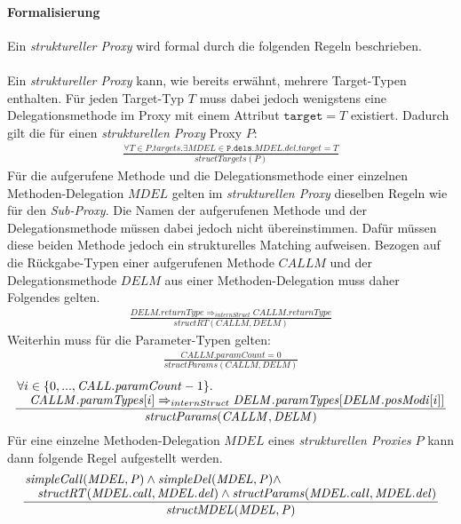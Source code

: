 \documentclass[a4paper,12pt]{article}
\begin{document}
\paragraph{Formalisierung}
Ein \emph{struktureller Proxy} wird formal durch die folgenden Regeln beschrieben.\\\\
Ein \emph{struktureller Proxy} kann, wie bereits erwähnt, mehrere Target-Typen enthalten.
Für jeden Target-Typ $T$ muss dabei jedoch wenigstens eine Delegationsmethode im Proxy mit einem Attribut $\texttt{target} = T$ existiert. Dadurch gilt die für einen \emph{strukturellen Proxy} Proxy $P$:
\begin{gather*}
\frac{\forall T \in \mathit{P.targets}.\exists \mathit{MDEL} \in \mathtt{P.dels}.\mathit{MDEL.del.target} = T}{\mathit{structTargets(P)}}
\end{gather*}
Für die aufgerufene Methode und die Delegationsmethode einer einzelnen Methoden-Delegation $\mathit{MDEL}$ gelten im \emph{strukturellen Proxy} dieselben Regeln wie für den \emph{Sub-Proxy}. Die Namen der aufgerufenen Methode und der Delegationsmethode müssen dabei jedoch nicht übereinstimmen. Dafür müssen diese beiden Methode jedoch ein strukturelles Matching aufweisen. Bezogen auf die Rückgabe-Typen einer aufgerufenen Methode $\mathit{CALLM}$ und der Delegationsmethode $\mathit{DELM}$ aus einer Methoden-Delegation muss daher Folgendes gelten.
\begin{gather*}
\frac{\mathit{DELM.returnType} \Rightarrow_{internStruct} \mathit{CALLM.returnType}}{\mathit{structRT(CALLM, DELM)}}
\end{gather*} 
Weiterhin muss für die Parameter-Typen gelten:
\begin{gather*}
\frac{\mathit{CALLM.paramCount} = 0}{\mathit{structParams(CALLM, DELM)}}
\end{gather*} 
\begin{gather*}
\frac{\splitfrac{\forall i \in \{0,...,\mathit{CALL.paramCount}-1\}.}
{ \mathit{CALLM.paramTypes}[i] \Rightarrow_{internStruct} \mathit{DELM.paramTypes}[\mathit{DELM.posModi}[i]]
}}{\mathit{structParams(CALLM, DELM)}}
\end{gather*} 
Für eine einzelne Methoden-Delegation $\mathit{MDEL}$ eines \emph{strukturellen Proxies} $P$ kann dann folgende Regel aufgestellt werden.
\begin{gather*}
\frac{\splitfrac{\mathit{simpleCall(MDEL,P)} \wedge \mathit{simpleDel(MDEL,P)} \wedge} {\mathit{structRT(MDEL.call, MDEL.del)} \wedge \mathit{structParams(MDEL.call, MDEL.del)}}
}
{\mathit{structMDEL(MDEL, P)}}
\end{gather*}
\end{document}
